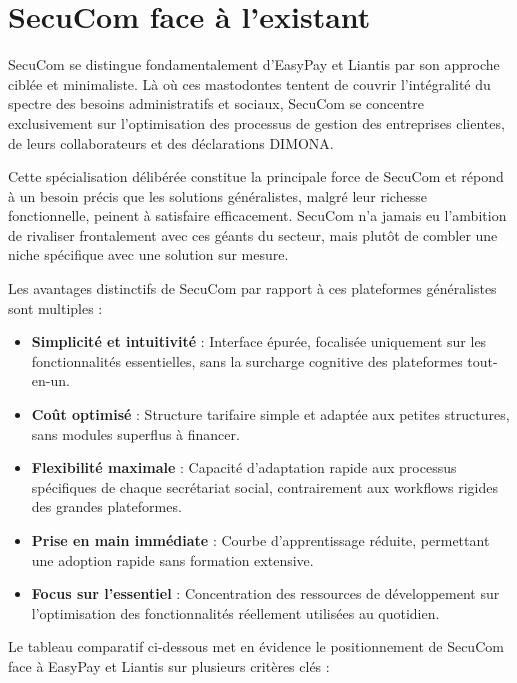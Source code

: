 \documentclass[12pt,a4paper]{report}
\begin{document}
\section{SecuCom face à l'existant}

SecuCom se distingue fondamentalement d'EasyPay et Liantis par son approche ciblée et minimaliste. Là où ces mastodontes tentent de couvrir l'intégralité du spectre des besoins administratifs et sociaux, SecuCom se concentre exclusivement sur l'optimisation des processus de gestion des entreprises clientes, de leurs collaborateurs et des déclarations DIMONA.

Cette spécialisation délibérée constitue la principale force de SecuCom et répond à un besoin précis que les solutions généralistes, malgré leur richesse fonctionnelle, peinent à satisfaire efficacement. SecuCom n'a jamais eu l'ambition de rivaliser frontalement avec ces géants du secteur, mais plutôt de combler une niche spécifique avec une solution sur mesure.

Les avantages distinctifs de SecuCom par rapport à ces plateformes généralistes sont multiples :

\begin{itemize}
  \item \textbf{Simplicité et intuitivité} : Interface épurée, focalisée uniquement sur les fonctionnalités essentielles, sans la surcharge cognitive des plateformes tout-en-un.
  \item \textbf{Coût optimisé} : Structure tarifaire simple et adaptée aux petites structures, sans modules superflus à financer.
  \item \textbf{Flexibilité maximale} : Capacité d'adaptation rapide aux processus spécifiques de chaque secrétariat social, contrairement aux workflows rigides des grandes plateformes.
  \item \textbf{Prise en main immédiate} : Courbe d'apprentissage réduite, permettant une adoption rapide sans formation extensive.
  \item \textbf{Focus sur l'essentiel} : Concentration des ressources de développement sur l'optimisation des fonctionnalités réellement utilisées au quotidien.
\end{itemize}

Le tableau comparatif ci-dessous met en évidence le positionnement de SecuCom face à EasyPay et Liantis sur plusieurs critères clés :
\end{document}
